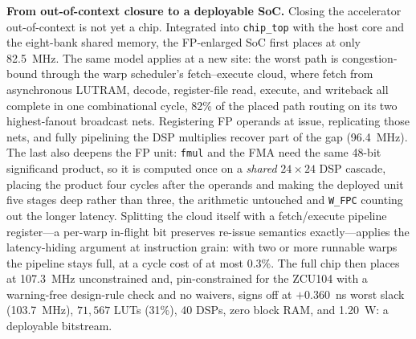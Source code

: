 \documentclass[10pt,conference]{IEEEtran}
\begin{document}
\textbf{From out-of-context closure to a deployable SoC.} Closing the accelerator
out-of-context is not yet a chip. Integrated into \texttt{chip\_top} with the host
core and the eight-bank shared memory, the FP-enlarged SoC first places at only
82.5~MHz. The same model applies at a new site: the worst path is congestion-bound
through the warp scheduler's fetch--execute cloud, where fetch from asynchronous
LUTRAM, decode, register-file read, execute, and writeback all complete in one
combinational cycle, 82\% of the placed path routing on its two highest-fanout
broadcast nets. Registering FP operands at issue, replicating those nets, and
fully pipelining the DSP multiplies recover part of the gap (96.4~MHz).
The last also deepens the FP unit: \texttt{fmul} and the FMA need the same 48-bit
significand product, so it is computed once on a \emph{shared} $24\times24$ DSP
cascade, placing the product four cycles after the operands and making the
deployed unit five stages deep rather than three, the arithmetic untouched and
\texttt{W\_FPC} counting out the longer latency. Splitting the cloud itself with a
fetch/execute pipeline register---a per-warp in-flight bit preserves re-issue
semantics exactly---applies the latency-hiding argument at instruction grain: with
two or more runnable warps the pipeline stays full, at a cycle cost of at most
0.3\%. The full chip then places at 107.3~MHz unconstrained and, pin-constrained
for the ZCU104 with a warning-free design-rule check and no waivers, signs off at
$+0.360$~ns worst slack (103.7~MHz), $71{,}567$ LUTs (31\%), 40 DSPs, zero block
RAM, and 1.20~W: a deployable bitstream.

\end{document}
